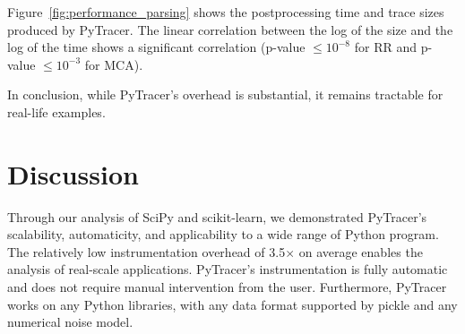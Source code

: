 \documentclass[10pt,journal,compsoc]{IEEEtran}
\newcommand{\pytracer}[0]{PyTracer\xspace}
\begin{document}

Figure~\ref{fig:performance_parsing} shows the postprocessing time and trace
sizes produced by \pytracer. The linear correlation between the log of the size
and the log of the time shows a significant correlation (p-value $\leq 10^{-8}$
for RR and p-value $\leq 10^{-3}$ for MCA).

In conclusion, while \pytracer's overhead is substantial, it remains tractable
for real-life examples.

\section{Discussion}



Through our analysis of SciPy and scikit-learn, we demonstrated \pytracer's
scalability, automaticity, and applicability to a wide range of Python program.
The relatively low instrumentation overhead of 3.5$\times$ on average enables
the analysis of real-scale applications. \pytracer's instrumentation is fully
automatic and does not require manual intervention from the user. Furthermore,
\pytracer works on any Python libraries, with any data format supported by
pickle and any numerical noise model.
\end{document}

